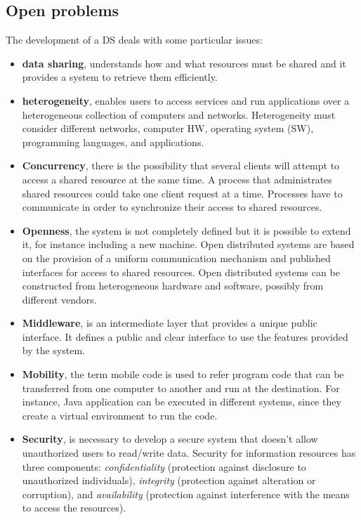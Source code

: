 \subsection{Open problems}
The development of a DS deals with some particular issues:
\begin{itemize}
    \item \textbf{data sharing}, understands how and what resources must be shared and it provides a system to retrieve them efficiently.
    \item \textbf{heterogeneity}, enables users to access services and run applications over a heterogeneous collection of computers and networks. Heterogeneity must consider different networks, computer HW, operating system (SW), programming languages, and applications.
    \item \textbf{Concurrency}, there is the possibility that several clients will attempt to access a shared resource at the same time. A process that administrates shared resources could take one client request at a time. Processes have to communicate in order to synchronize their access to shared resources.
    \item \textbf{Openness}, the system is not completely defined but it is possible to extend it, for instance including a new machine. Open distributed systems are based on the provision of a uniform communication mechanism and published interfaces for access to shared resources. Open distributed systems can be constructed from heterogeneous hardware and software, possibly from different vendors.
    \item \textbf{Middleware}, is an intermediate layer that provides a unique public interface. It defines a public and clear interface to use the features provided by the system.
    \item \textbf{Mobility}, the term mobile code is used to refer program code that can be transferred from one computer to another and run at the destination. For instance, Java application can be executed in different systems, since they create a virtual environment to run the code.
    \item \textbf{Security}, is necessary to develop a secure system that doesn't allow unauthorized users to read/write data. Security for information resources has three components: \textit{confidentiality} (protection against disclosure to unauthorized individuals), \textit{integrity} (protection against alteration or corruption), and \textit{availability} (protection against interference with the means to access the resources).

\end{itemize}
